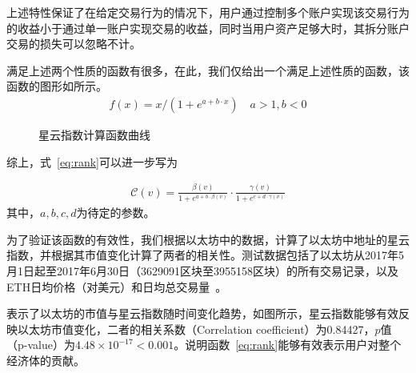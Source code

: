 \noindent 上述特性保证了在给定交易行为的情况下，用户通过控制多个账户实现该交易行为的收益小于通过单一账户实现交易的收益，同时当用户资产足够大时，其拆分账户交易的损失可以忽略不计。

\noindent 满足上述两个性质的函数有很多，在此，我们仅给出一个满足上述性质的函数，该函数的图形如所示。
\begin{align}
f(x) = x/(1 + e^{a + b\cdot x}) \quad a>1,b<0
\end{align}

\begin{figure}
\centering
{}
\caption{星云指数计算函数曲线 \label{fig-nr}}
\end{figure}

\vspace{2em}
综上，式~\ref{eq:rank}可以进一步写为

\begin{align}
\label{eq:rank-param}
\mathcal{C}(v) =  \frac{\beta(v)}{1+e^{a + b \cdot \beta(v)}} \cdot \frac{\gamma(v)}{1+e^{c + d \cdot \gamma(v)}}
\end{align}
\noindent 其中，$a, b, c, d$为待定的参数。

为了验证该函数的有效性，我们根据以太坊中的数据，计算了以太坊中地址的星云指数，并根据其市值变化计算了两者的相关性。测试数据包括了以太坊从2017年5月1日起至2017年6月30日（3629091区块至3955158区块）的所有交易记录，以及ETH日均价格（对美元）和日均总交易量~\cite{coinmarketcap}。


表示了以太坊的市值与星云指数随时间变化趋势，如图所示，星云指数能够有效反映以太坊市值变化，二者的相关系数（Correlation coefficient）为0.84427，$p$值（p-value）为$4.48\times{}10^{-17}<0.001$。说明函数~\ref{eq:rank}能够有效表示用户对整个经济体的贡献。


